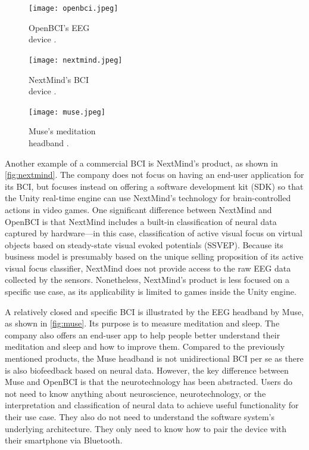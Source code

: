 \begin{figure}[!ht]
  \texttt{[image: openbci.jpeg]}
  \caption[OpenBCI’s EEG device.]{OpenBCI’s EEG \\ device \citep{be_superhvman_conor_2017}.}
  \label{fig:openbci}
  \endminipage\hfill
  \texttt{[image: nextmind.jpeg]}
  \caption[NextMind’s BCI device.]{NextMind’s BCI \\ device \citep{louise_neurotechnology_2019}.}
  \label{fig:nextmind}
  \endminipage\hfill
  \texttt{[image: muse.jpeg]}
  \caption[Muse’s meditation headband.]{Muse’s meditation \\ headband \citep{muse_muse_nodate}.}
  \label{fig:muse}
  \endminipage
\end{figure}

Another example of a commercial BCI is NextMind’s product, as shown in \autoref{fig:nextmind}. The company does not focus on having an end-user application for its BCI, but focuses instead on offering a software development kit (SDK) so that the Unity real-time engine can use NextMind’s technology for brain-controlled actions in video games. One significant difference between NextMind and OpenBCI is that NextMind includes a built-in classification of neural data captured by hardware—in this case, classification of active visual focus on virtual objects based on steady-state visual evoked potentials (SSVEP). Because its business model is presumably based on the unique selling proposition of its active visual focus classifier, NextMind does not provide access to the raw EEG data collected by the sensors. Nonetheless, NextMind’s product is less focused on a specific use case, as its applicability is limited to games inside the Unity engine.

A relatively closed and specific BCI is illustrated by the EEG headband by Muse, as shown in \autoref{fig:muse}. Its purpose is to measure meditation and sleep. The company also offers an end-user app to help people better understand their meditation and sleep and how to improve them. Compared to the previously mentioned products, the Muse headband is not unidirectional BCI per se as there is also biofeedback based on neural data. However, the key difference between Muse and OpenBCI is that the neurotechnology has been abstracted. Users do not need to know anything about neuroscience, neurotechnology, or the interpretation and classification of neural data to achieve useful functionality for their use case. They also do not need to understand the software system’s underlying architecture. They only need to know how to pair the device with their smartphone via Bluetooth.

